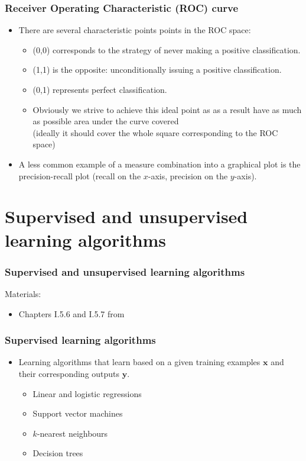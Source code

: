 \documentclass[notes]{beamer}          %
\newcommand{\vect}[1]{\bm{#1}}
\begin{document}
\begin{frame}
\frametitle{Receiver Operating Characteristic (ROC) curve}
    \begin{itemize}
        \item  There are several characteristic points points in the ROC space:
            \begin{itemize}
                \item (0,0) corresponds to the strategy of never making a positive classification.
                \item (1,1) is the opposite: unconditionally issuing a positive classification.
                \item (0,1) represents perfect classification.
                \item Obviously we strive to achieve this ideal point as as a result have as much as possible area under the curve covered \\
                (ideally it should cover the whole square corresponding to the ROC space)
            \end{itemize}
        \item  A less common example of a measure combination into a graphical plot is the precision-recall plot (recall on the $x$-axis, precision on the $y$-axis).
    \end{itemize}
\end{frame}


\section{Supervised and unsupervised learning algorithms}

\begin{frame}
\frametitle{Supervised and unsupervised learning algorithms}
Materials:
\begin{itemize}
    \item Chapters I.5.6 and I.5.7 from \cite{deeplearning}
\end{itemize}
\end{frame}

\begin{frame}
\frametitle{Supervised learning algorithms}
    \begin{itemize}
        \item Learning algorithms that learn based on a given training examples $\vect{x}$ and their corresponding outputs $\vect{y}$.
        \begin{itemize}
            \item Linear and logistic regressions
            \item Support vector machines
            \item $k$-nearest neighbours
            \item Decision trees
        \end{itemize}
    \end{itemize}
\end{frame}
\end{document}
